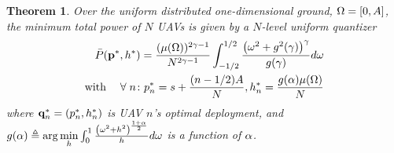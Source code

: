 \documentclass[smallabstract,smallcaptions]{dccpaper}
\newtheorem{theorem}{Theorem}
\newcommand{\bP}{\ensuremath{\vp}}          %
\newcommand{\Pbar}{\ensuremath{\bar{P}}}         %
\begin{document}
\begin{theorem}\label{theorem:commonHeight}
Over the uniform distributed one-dimensional ground, $\Omega=[0,A]$,
the minimum total power of $N$ UAVs is given by a $N$-level uniform quantizer
%
\begin{align}
  \Pbar(\bP^{*},h^{*})=
   \frac{(\mu(\Omega))^{2\gam-1}}{N^{2\gam-1}}\int_{-1/2}^{1/2}\frac{\left(\ome^2+g^2(\gam)\right)^{\gam}}{g(\gam)} d\ome\\
    \text{with}\quad \forall n \colon
     p^*_n=
     s+\frac{(n-1/2)A}{N}, h^*_n=
     \frac{g(\alp)\mu(\Omega)}{N}\label{eq:alponedonehequal}
  \end{align}
  where ${\mathbf q}_n^*=(p^*_n, h^*_n)$ is UAV $n$'s optimal deployment, and $g(\alpha)\triangleq\arg\min\limits_{h}\int_{0}^{1}
  \frac{\left(\omega^2 + h^2\right)^{\frac{1+\alpha}{2}}}{h} d\omega$ is a function of $\alpha$.
\end{theorem}
%
\end{document}
